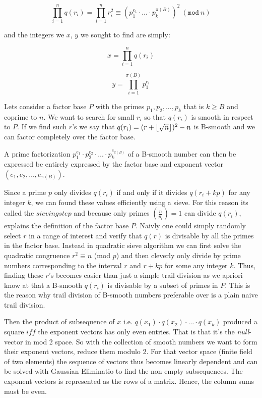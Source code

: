 \begin{equation}
 \prod_{i=1}^{n} q(r_i) = \prod_{i=1}^{n} r_i^2 \equiv (p_1^{e_{1}} \cdot \ldots \cdot p_k^{\pi(B)})^2 \ (\texttt{mod} \ n)
\end{equation}

and the integers we $x$, $y$ we sought to find are simply:

\begin{equation}
 x = \prod_{i=1}^{n} q(r_i)
\end{equation}

\begin{equation}
y = \prod_{i=1}^{\pi(B)} p_1^{e_{i}}
\end{equation}

Lets consider a factor base $P$ with the primes $p_1, p_2, ..., p_k$ that is $k \geq B$ and coprime to $n$.
We want to search for small $r_i$ so that $q(r_i)$ is smooth in respect to $P$. If we find such $r$'s we say that $q(r_i) = (r + \left \lfloor \sqrt{n} \right \rfloor)^2-n$ is B-smooth and we can factor completely over the factor base.

A prime factorization $p_1^{e_1} \cdot p_2^{e_2} \cdot \ldots \cdot p_k^{e_{\pi(B)}}$ of a B-smooth number can then be expressed be entirely expressed by the factor base and exponent vector $(e_1, e_2, \ldots, e_{\pi(B)})$.

Since a prime $p$ only divides $q(r_i)$ if and only if it divides $q(r_i+kp)$ for any integer
$k$, we can found these values efficiently using a sieve. For this reason its called the $sieving step$ and because only primes $(\frac{n}{p_i}) = 1$ can divide $q(r_i)$, explains the definition of the factor base $P$. 
Naivly one could simply randomly select $r$ in a range of interest and verify that $q(r)$ is divisable by all the primes in the factor base. Instead in quadratic sieve algorithm we can first solve the quadratic congruence $r^2 \equiv n$ (mod $p$) and then cleverly only divide by prime numbers corresponding to the interval $r$ and $r+kp$ for some any integer $k$. Thus, finding these $r$'s becomes easier than just a simple trail division as we apriori know at that a B-smooth $q(r_i)$ is divisable by a subset of primes in $P$. This is the reason why trail division of B-smooth numbers preferable over is a plain naive trail division.

Then the product of subsequence of $x$ i.e. $q(x_1) \cdot q(x_2) \cdot \ldots \cdot q(x_k)$ produced a 
square $iff$ the exponent vectors has only even entries. That is that it's the \emph{null}-vector in mod 2
space. So with the collection of smooth numbers we want to form their exponent vectors, reduce them modulo 2. For that vector space (finite field of two elements) the sequence of vectors thus becomes linearly dependent and can be solved with Gaussian Eliminatio to find the non-empty subsequences. The exponent vectors is represented as the rows of a matrix. Hence, the column sums must be even.

